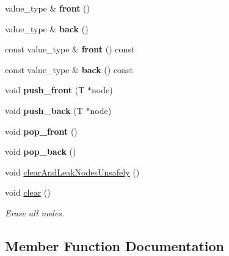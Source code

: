 \begin{DoxyCompactItemize}
value\+\_\+type \& {\bfseries front} ()
\item 
\mbox{\label{classglow_1_1_tagged_list_aeee078ea4642058ab03f06d402e91e6c}} 
value\+\_\+type \& {\bfseries back} ()
\item 
\mbox{\label{classglow_1_1_tagged_list_ae143e1256a2456b047362d989a314e0e}} 
const value\+\_\+type \& {\bfseries front} () const
\item 
\mbox{\label{classglow_1_1_tagged_list_a56aad7dac38d095b2867f0ea508b6651}} 
const value\+\_\+type \& {\bfseries back} () const
\item 
\mbox{\label{classglow_1_1_tagged_list_afa9f231c027203dba2d992a99323eb87}} 
void {\bfseries push\+\_\+front} (T $\ast$node)
\item 
\mbox{\label{classglow_1_1_tagged_list_ad37a6482f156d485f743f94d1d834ac7}} 
void {\bfseries push\+\_\+back} (T $\ast$node)
\item 
\mbox{\label{classglow_1_1_tagged_list_af4a01cdddfa9fb69b34af3bc08f7fdd7}} 
void {\bfseries pop\+\_\+front} ()
\item 
\mbox{\label{classglow_1_1_tagged_list_a40e9cd926d2384268676ec3ba75c60c3}} 
void {\bfseries pop\+\_\+back} ()
\item 
void \hyperlink{classglow_1_1_tagged_list_a50d5fde66db486a2ad6ea77935b8204f}{clear\+And\+Leak\+Nodes\+Unsafely} ()
\item 
\mbox{\label{classglow_1_1_tagged_list_a8101da62b834b2187d2de8824f2ff994}} 
void \hyperlink{classglow_1_1_tagged_list_a8101da62b834b2187d2de8824f2ff994}{clear} ()
\begin{DoxyCompactList}\small\item\em Erase all nodes. \end{DoxyCompactList}\end{DoxyCompactItemize}


\subsection{Member Function Documentation}
\mbox{\label{classglow_1_1_tagged_list_a50d5fde66db486a2ad6ea77935b8204f}} 
